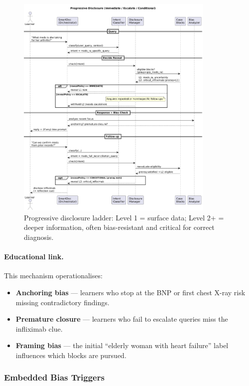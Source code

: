 \begin{figure}[h]
    \centering
    \includegraphics[width=0.85\textwidth]{figures/diagrams/progressive-disclosure.png}
    \caption{Progressive disclosure ladder: Level 1 = surface data; Level 2+ = deeper
    information, often bias-resistant and critical for correct diagnosis.}
    \label{fig:progressive_disclosure}
\end{figure}

\paragraph{Educational link.}
This mechanism operationalises:
\begin{itemize}
    \item \textbf{Anchoring bias} — learners who stop at the BNP or first chest X-ray
    risk missing contradictory findings.
    \item \textbf{Premature closure} — learners who fail to escalate queries miss the
    infliximab clue.
    \item \textbf{Framing bias} — the initial “elderly woman with heart failure” label
    influences which blocks are pursued.
\end{itemize}

\subsubsection{Embedded Bias Triggers}

